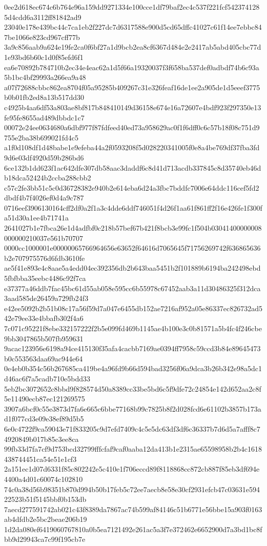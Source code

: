 {0ee2d618ec674c6b764e96a159dd9271334e100cce1df79baf2ec4c537f221fcf5423741285d4cdd6a3112ff81842ad9
23040e178e439bc44c7ca1eb2f227dc7d6317588e900d5cd65dffc41027c61f14ee7ebbc847be1066e823cd967cff77b
3a9c856aab9a624e19fe2ca0f6bf27a1d9bcb2ea8cf6367d484e2e2417ab5abd405cbc77d1e93bd6b60c1d0f85efd6f1
ea6e70892b784710b2ec34e4eac62a1d5f66a19320037f3f658ba537def0adbdf74b6c93a5b1bc4bf29993a266ea9a48
a07f72688cbbc862ea8704f05a95285b409267c31e326feaf16de1ee2a905de1d5eeef3775b0b01fb2ed8a13b517dd30
c4925b4aa6df53a803ae8bf817b848410149d36158e674e16a72607e4bdf923f297350e13fe95fe8655ad489dbbdc1c7
00072e24ee0634680a6dbf977f87fdfeed40ed73a958629ac0f1f6dff0c6c57b18f08c751d9755e2ba38b699021fd4c5
a1f0d108df1d48babe1e9efeba44a2f0593208f5d028220341005f0e8a4be769df37fba3fd9d6e03df4920d59b286bd6
6ce132b1dd623f1ac642dfe307db58aac3daddf6c8d41d713acdb337845c8d35740eb46db18dca52424b2ccba288cbb2
c57c2fe3bb51c5c0d36728382e940b2e614eba6d24a3fbc7bddfc7006e64ddc116cef5fd2dbdf4b7f4026ef0d4a9c787
0716eef3906130164cff2df0a2f1a3c4dde6ddf746051f4d26f1aa61f861ff2f16e426fe1f300fa51d30a1ee4b71741a
2641027b1e7fbca26e1d4adfbf0c218b57bef67b421f8bcb3e99fc1f504b03041400000008000000210037e561b70707
0000cc1000001e00000065766964656e63652f64616d7065645f71756269742f636865636b2e707975576d6fdb3610fe
ae5f41e893e4c8aae5a4edd04ec392356db2b643baa5451b2f101889b6194ba242498ebd5fbfbba35eebc4486c92f7ca
e37377a46ddb7fac45bc61d55ab058e595cc6b55978c67452aab3a11d30486325f312dca3aad585de26459a729fb24f3
e42ee5092b2b51b08c17a56f59d7a047e6455db152ae7216af952a05e86337ec826732ad542e79ee33e4bbafb302f4a6
7c071c95221f8ebe332157222f2b5e099fd469b1145ae4b100e3c0b81571a5b4fc4f246cbe9bb3047865b507fb959631
9acac123956e6198a94ce415130f35afa4cacbb7169ae0394ff7958c59ccd3b84e89645473b0c553563daa69ac944e64
0e4eb0b354c56b267685ca419be4a96fd9b66d594bad3256f06a9dca3b26b342e98a5dc1d46ac6f7a5cadb710e5bdd33
5eb2bc3072652c8bbd9f828574d50a8389cc33be5bd6c5f9dfe72c24854e142d652aa2c8f5e11490ecb87ec121269575
3907a6bcf0c55e3873d7fa6e665c6bbe77168b99c7825b8f2d028fcd6e61102b3857b173ad1f077cd3e09e38ef89d5b5
6e0c4722f9ca59043e71f833205c9d7efd7409c4c5e5dc63df3df6c36337b7d6d5a7afff8c74920849b017b85c3ee8ca
99fb33d7fa7cf9d753bcd32799fffcfaf9caf0aaba12da413b1e2315ae65598958b2b4c1618438744451ca54e51e1cf3
2a151ec1d07d6331f85c802242e5c410e1f706eccd89f8118868cc872cb887f85eb3df694e4400a4d01c60074c102810
74c0a38d56b98351b870d994b50b17feb5c72ee7aecb8e58e30cf2931efcb47c03631e59422523b51f5145bbf0b153db
7aecd277591742ab021c43f8389da7867ac74b599af84146c51b6771e56bbe15a903f0163ab4dfdb2e5bc2beae206b19
1d2da080ef6419060767810a0b5ea7121492e261ac5a3f7e372462e6652900d7a3bd1bc8fbb9d29943ca7c99f195cb7e
}
